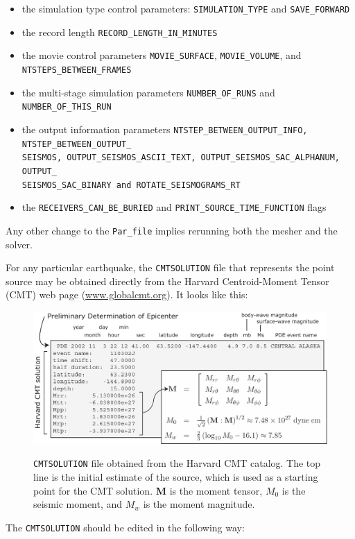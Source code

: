 \documentclass[oneside,english]{book}
\newenvironment{lyxcode}
{\begin{list}{}{
\setlength{\rightmargin}{\leftmargin}
\setlength{\listparindent}{0pt}%
\raggedright
\setlength{\itemsep}{0pt}
\setlength{\parsep}{0pt}
\normalfont\ttfamily}%
 \item[]}
{\end{list}}
\newcommand{\urlwithparentheses}[1]{(\url{#1})}
\begin{document}
\begin{itemize}
\item the simulation type control parameters: \texttt{SIMULATION\_TYPE}
and \texttt{SAVE\_FORWARD}
\item the record length \texttt{RECORD\_LENGTH\_IN\_MINUTES}
\item the movie control parameters \texttt{MOVIE\_SURFACE}, \texttt{MOVIE\_VOLUME},
and \texttt{NTSTEPS\_BETWEEN\_FRAMES}
\item the multi-stage simulation parameters \texttt{NUMBER\_OF\_RUNS} and
\texttt{NUMBER\_OF\_THIS\_RUN}
\item the output information parameters \texttt{NTSTEP\_BETWEEN\_OUTPUT\_INFO,
NTSTEP\_BETWEEN\_OUTPUT\_}~\\
\texttt{SEISMOS, OUTPUT\_SEISMOS\_ASCII\_TEXT, OUTPUT\_SEISMOS\_SAC\_ALPHANUM,
OUTPUT\_}~\\
\texttt{SEISMOS\_SAC\_BINARY and ROTATE\_SEISMOGRAMS\_RT}
\item the \texttt{RECEIVERS\_CAN\_BE\_BURIED} and \texttt{PRINT\_SOURCE\_TIME\_FUNCTION}
flags
\end{itemize}
Any other change to the \texttt{Par\_file} implies rerunning both
the mesher and the solver.

For any particular earthquake, the \texttt{CMTSOLUTION} file that
represents the point source may be obtained directly from the Harvard Centroid-Moment Tensor (CMT) web page \urlwithparentheses{www.globalcmt.org}.
It looks like this:

\begin{lyxcode}
{\small }%
\begin{figure}[H]
\noindent \begin{centering}
{\small \includegraphics[width=1\textwidth]{figures/Denali_CMT} }
\par\end{centering}{\small \par}

\caption{\texttt{CMTSOLUTION} file obtained from the Harvard CMT catalog. The
top line is the initial estimate of the source, which is used as a
starting point for the CMT solution. \textbf{M} is the moment tensor,
$M_{0}${\small{} }is the seismic moment, and $M_{w}$ is the moment
magnitude.}


\label{fig:CMTSOLUTION-file}
\end{figure}
{\small \par}
\end{lyxcode}
The \texttt{CMTSOLUTION} should be edited in the following way:
\end{document}
